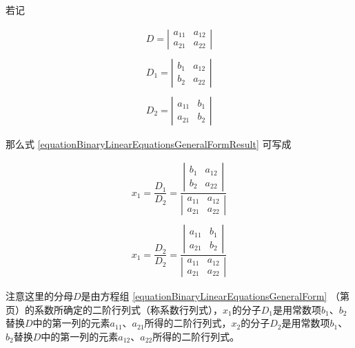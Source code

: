 若记

\begin{equation}
	\begin{array}{r}
	D = \left | \begin{array}{cc}
			a_{11} & a_{12}\\
			a_{21} & a_{22}
			\end{array} \right | \\
	\\
	D_{1} = \left | \begin{array}{cc}
		b_{1} & a_{12}\\
		b_{2} & a_{22}
		\end{array} \right | \\
	\\
	D_{2} = \left | \begin{array}{cc}
		a_{11} & b_{1}\\
		a_{21} & b_{2}
		\end{array} \right |
	\end{array}
\end{equation}

那么式 \ref{equationBinaryLinearEquationsGeneralFormResult} 可写成

\begin{equation}
	\begin{array}{r}
	x_{1}= \dfrac{D_{1}}{D_{2}} = \dfrac{\left | \begin{array}{cc}
			b_{1} & a_{12}\\
			b_{2} & a_{22}
			\end{array} \right |}{\left | \begin{array}{cc}
				a_{11} & a_{12}\\
				a_{21} & a_{22}
				\end{array} \right |}\\
	\\
	
	x_{1}= \dfrac{D_{2}}{D_{2}} = \dfrac{\left | \begin{array}{cc}
			a_{11} & b_{1}\\
			a_{21} & b_{2}
			\end{array} \right |}{\left | \begin{array}{cc}
					a_{11} & a_{12}\\
					a_{21} & a_{22}
					\end{array} \right |}
	\end{array}
\end{equation}

注意这里的分母$ D $是由方程组 \ref{equationBinaryLinearEquationsGeneralForm} （第\pageref{equationBinaryLinearEquationsGeneralForm}页）的系数所确定的二阶行列式（称系数行列式），$ x_{1} $的分子$ D_{1} $是用常数项$ b_{1} $、$ b_{2} $替换$ D $中的第一列的元素$ a_{11} $、$ a_{21} $所得的二阶行列式，$ x_{2} $的分子$ D_{2} $是用常数项$ b_{1} $、$ b_{2} $替换$ D $中的第一列的元素$ a_{12} $、$ a_{22} $所得的二阶行列式。

